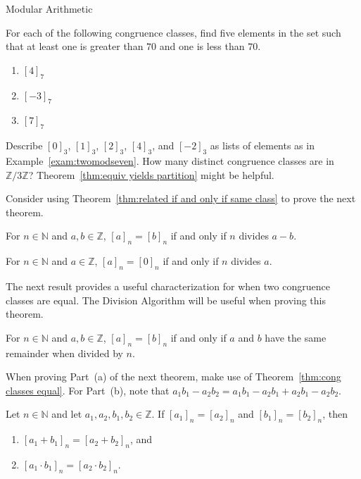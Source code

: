 \begin{section}{Modular Arithmetic}
\begin{problem}
For each of the following congruence classes, find five elements in the set such that at least one is greater than $70$ and one is less than $70$.
\begin{enumerate}[label=\textrm{(\alph*)}]
\item $[4]_7$ 
\item $[-3]_7$
\item $[7]_7$
\end{enumerate}
\end{problem}

\begin{problem}
Describe $[0]_3$, $[1]_3$, $[2]_3$, $[4]_3$, and $[-2]_3$ as lists of elements as in Example~\ref{exam:twomodseven}. How many distinct congruence classes are in $\mathbb{Z}/3\mathbb{Z}$? Theorem~\ref{thm:equiv yields partition} might be helpful.
\end{problem}

Consider using Theorem~\ref{thm:related if and only if same class} to prove the next theorem.

\begin{theorem}\label{thm:cong classes equal}
For $n\in \mathbb{N}$ and $a,b\in \mathbb{Z}$, $[a]_n = [b]_n$ if and only if $n$ divides $a-b$. 
\end{theorem}

\begin{corollary}\label{cor:divisible iff zero mod}
For $n\in \mathbb{N}$ and $a\in \mathbb{Z}$, $[a]_n = [0]_n$ if and only if $n$ divides $a$.
\end{corollary}

The next result provides a useful characterization for when two congruence classes are equal. The Division Algorithm will be useful when proving this theorem.

\begin{theorem}
For $n\in \mathbb{N}$ and $a,b\in \mathbb{Z}$, $[a]_n = [b]_n$ if and only if $a$ and $b$ have the same remainder when divided by $n$. 
\end{theorem}

When proving Part~(a) of the next theorem, make use of Theorem~\ref{thm:cong classes equal}. For Part~(b), note that $a_1b_1-a_2b_2 = a_1b_1 -a_2b_1 + a_2b_1-a_2b_2$.

\begin{theorem}
Let $n\in \mathbb{N}$ and let $a_1,a_2,b_1,b_2 \in \mathbb{Z}$. If $[a_1]_n = [a_2]_n$ and $[b_1]_n = [b_2]_n$, then 
\begin{enumerate}[label=\textrm{(\alph*)}]
\item $[a_1+b_1]_n = [a_2+b_2]_n$, and
\item $[a_1\cdot b_1]_n = [a_2\cdot b_2]_n$.
\end{enumerate}
\end{theorem}


\end{section}
